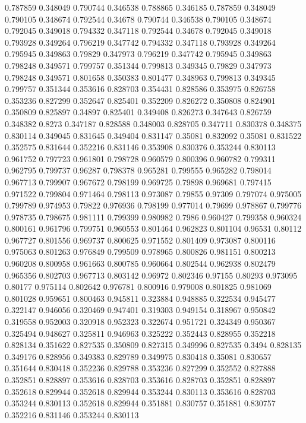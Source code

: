 0.787859 0.348049
0.790744 0.346538
0.788865 0.346185
0.787859 0.348049
0.790105 0.348674
0.792544 0.34678
0.790744 0.346538
0.790105 0.348674
0.792045 0.349018
0.794332 0.347118
0.792544 0.34678
0.792045 0.349018
0.793928 0.349264
0.796219 0.347742
0.794332 0.347118
0.793928 0.349264
0.795945 0.349863
0.79829 0.347973
0.796219 0.347742
0.795945 0.349863
0.798248 0.349571
0.799757 0.351344
0.799813 0.349345
0.79829 0.347973
0.798248 0.349571
0.801658 0.350383
0.801477 0.348963
0.799813 0.349345
0.799757 0.351344
0.353616 0.828703
0.354431 0.828586
0.353975 0.826758
0.353236 0.827299
0.352647 0.825401
0.352209 0.826272
0.350808 0.824901
0.350809 0.825897
0.34897 0.825401
0.349408 0.826273
0.347643 0.826759
0.348382 0.8273
0.347187 0.828588
0.348003 0.828705
0.347711 0.830378
0.348375 0.830114
0.349045 0.831645
0.349404 0.831147
0.35081 0.832092
0.35081 0.831522
0.352575 0.831644
0.352216 0.831146
0.353908 0.830376
0.353244 0.830113
0.961752 0.797723
0.961801 0.798728
0.960579 0.800396
0.960782 0.799311
0.962795 0.799737
0.96287 0.798378
0.965281 0.799555
0.965282 0.798014
0.967713 0.799907
0.967672 0.798199
0.969725 0.79898
0.969681 0.797415
0.971522 0.799804
0.971464 0.798113
0.973087 0.79855
0.97309 0.797074
0.975005 0.799789
0.974953 0.79822
0.976936 0.798199
0.977014 0.79699
0.978867 0.799776
0.978735 0.798675
0.981111 0.799399
0.980982 0.7986
0.960427 0.799358
0.960324 0.800161
0.961796 0.799751
0.960553 0.801464
0.962823 0.801104
0.96531 0.80112
0.967727 0.801556
0.969737 0.800625
0.971552 0.801409
0.973087 0.800116
0.975063 0.801263
0.976849 0.799509
0.978965 0.800826
0.981151 0.800213
0.960208 0.800958
0.961663 0.800785
0.960664 0.802544
0.962938 0.802479
0.965356 0.802703
0.967713 0.803142
0.96972 0.802346
0.97155 0.80293
0.973095 0.80177
0.975114 0.802642
0.976781 0.800916
0.979008 0.801825
0.981069 0.801028
0.959651 0.800463
0.945811 0.323884
0.948885 0.322534
0.945477 0.322147
0.946056 0.320469
0.947401 0.319303
0.949154 0.318967
0.950842 0.319558
0.952003 0.320918
0.952323 0.322674
0.951721 0.324349
0.950367 0.325494
0.948627 0.325811
0.946963 0.325222
0.352443 0.828955
0.352218 0.828134
0.351622 0.827535
0.350809 0.827315
0.349996 0.827535
0.3494 0.828135
0.349176 0.828956
0.349383 0.829789
0.349975 0.830418
0.35081 0.830657
0.351644 0.830418
0.352236 0.829788
0.353236 0.827299
0.352552 0.827888
0.352851 0.828897
0.353616 0.828703
0.353616 0.828703
0.352851 0.828897
0.352618 0.829944
0.352618 0.829944
0.353244 0.830113
0.353616 0.828703
0.353244 0.830113
0.352618 0.829944
0.351881 0.830757
0.351881 0.830757
0.352216 0.831146
0.353244 0.830113
